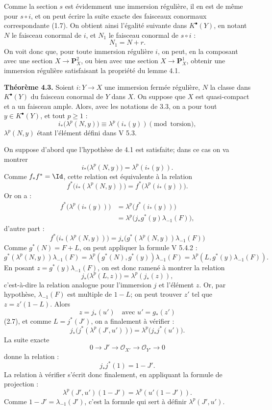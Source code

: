 \documentclass[11pt]{article}
\begin{document}
Comme la section \(s\) est évidemment une immersion régulière, il en est de même pour \(s\circ i\), et on peut écrire la suite exacte des faisceaux conormaux correspondante (1.7). On obtient ainsi l'égalité suivante dans \(K^\bullet(Y)\), en notant \(N\) le faisceau conormal de \(i\), et \(N_1\) le faisceau conormal de \(s\circ i\) :
\[
  N_1=N+r.
\]
On voit donc que, pour toute immersion régulière \(i\), on peut, en la composant avec une section \(X\to\mathbf P_X^2\), ou bien avec une section \(X\to\mathbf P_X^1\), obtenir une immersion régulière satisfaisant la propriété du lemme 4.1.

\textbf{Théorème 4.3.} Soient \(i:Y\to X\) une immersion fermée régulière, \(N\) la classe dans \(K^\bullet(Y)\) du faisceau conormal de \(Y\) dans \(X\). On suppose que \(X\) est quasi-compact et a un faisceau ample. Alors, avec les notations de 3.3, on a pour tout \(y\in K^\bullet(Y)\), et tout \(p\ge1\) :
\begin{equation}\tag{4.3.1}
 i_*\bigl(\lambda^p(N,y)\bigr)\equiv \lambda^p(i_*(y))
 \pmod{\text{torsion}},
\end{equation}
\(\lambda^p(N,y)\) étant l'élément défini dans V 5.3.

On suppose d'abord que l'hypothèse de 4.1 est satisfaite; dans ce cas on va montrer
\[
  i_*\bigl(\lambda^p(N,y)\bigr)=\lambda^p(i_*(y)).
\]
Comme \(f_*f^*=\Id\), cette relation est équivalente à la relation
\[
  f^*\bigl(i_*(\lambda^p(N,y))\bigr)=
  f^*\bigl(\lambda^p(i_*(y))\bigr).
\]
Or on a :
\[
\begin{aligned}
 f^*\bigl(\lambda^p(i_*(y))\bigr)
 &=\lambda^p\bigl(f^*(i_*(y))\bigr)\\
 &=\lambda^p\bigl(j_*g^*(y)\lambda_{-1}(F)\bigr),
\end{aligned}
\tag{3.4}
\]
d'autre part :
\[
  f^*\bigl(i_*(\lambda^p(N,y))\bigr)
  =
  j_*\bigl(g^*(\lambda^p(N,y))\lambda_{-1}(F)\bigr)
  \tag{3.4}
\]
Comme \(g^*(N)=F+L\), on peut appliquer la formule V 5.4.2 :
\[
  g^*(\lambda^p(N,y))\lambda_{-1}(F)
  =
  \lambda^p(g^*(N),g^*(y))\lambda_{-1}(F)
  =
  \lambda^p(L,g^*(y)\lambda_{-1}(F)).
\]
En posant \(z=g^*(y)\lambda_{-1}(F)\), on est donc ramené à montrer la relation
\[
  j_*\bigl(\lambda^p(L,z)\bigr)=\lambda^p(j_*(z)),
\]
c'est-à-dire la relation analogue pour l'immersion \(j\) et l'élément \(z\). Or, par hypothèse, \(\lambda_{-1}(F)\) est multiple de \(1-L\); on peut trouver \(z'\) tel que \(z=z'(1-L)\). Alors
\[
  z=j_*(u')\quad\text{avec }u'=g_*(z')
\]
(2.7), et comme \(L=j^*(J')\), on a finalement à vérifier :
\[
  j_*\bigl(j^*(\lambda^p(J',u'))\bigr)=
  \lambda^p\bigl(j_*j^*(u')\bigr).
\]
La suite exacte
\[
  0\longrightarrow J'\longrightarrow \mathcal O_{X'}
  \longrightarrow \mathcal O_{Y'}\longrightarrow 0
\]
donne la relation :
\begin{equation}\tag{4.3.2}
  j_*j^*(1)=1-J'.
\end{equation}
La relation à vérifier s'écrit donc finalement, en appliquant la formule de projection :
\[
  \lambda^p(J',u')(1-J')=\lambda^p(u'(1-J')).
\]
Comme \(1-J'=\lambda_{-1}(J')\), c'est la formule qui sert à définir \(\lambda^p(J',u')\).
\end{document}
